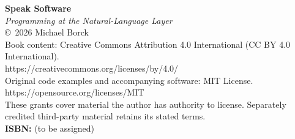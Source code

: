 \thispagestyle{empty}
\vspace*{2in}
\begin{center}
\textbf{\large Speak Software}\\[0.3em]
\textit{Programming at the Natural-Language Layer}\\[1em]
\copyright\ 2026 Michael Borck\\[0.5em]
Book content: Creative Commons Attribution 4.0 International (CC BY 4.0 International).\\
https://creativecommons.org/licenses/by/4.0/\\[0.5em]
Original code examples and accompanying software: MIT License.\\
https://opensource.org/licenses/MIT\\[0.5em]
These grants cover material the author has authority to license. Separately credited third-party material retains its stated terms.\\[1em]
\textbf{ISBN:} (to be assigned)\\[1em]
\end{center}
\clearpage
